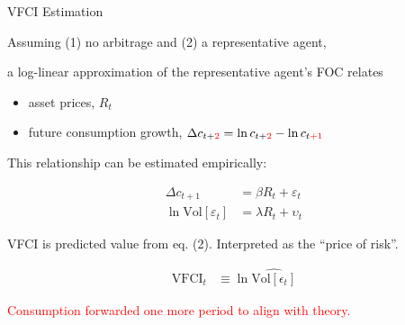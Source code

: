 \begin{frame}{VFCI Estimation}

  \vspace{0.3cm}
  Assuming (1) no arbitrage and (2) a representative agent,
  
  a log-linear approximation of the representative agent's FOC relates
  \begin{itemize}
    \item asset prices, $R_t$
    \item future consumption growth, $\Delta c_{t+\textcolor{red}{2}} = \ln c_{t+\textcolor{red}{2}} - \ln c_{t\textcolor{red}{+1}}$
  \end{itemize}

  This relationship can be estimated empirically:

  \vspace{-1cm}
  \begin{align}
    \Delta c_{t+1} &= \beta R_t + \varepsilon_t
    \\
    \ln \text{Vol}[\varepsilon_t] &= \lambda R_t + \upsilon_t
  \end{align}

  VFCI is predicted value from eq. (2). Interpreted as the ``price of risk''.

  \vspace{-1cm}
  \setcounter{equation}{0}
  \begin{align*}
    \text{VFCI}_t &\equiv \ln \widehat{\text{Vol}[\epsilon_t]}
  \end{align*}

  \textcolor{red}{Consumption forwarded one more period to align with theory.}

  
\end{frame}


